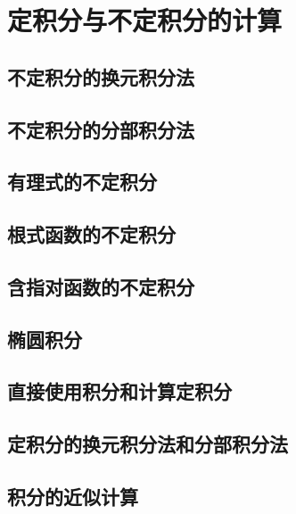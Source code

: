 
\section{定积分与不定积分的计算}
\label{sec:computation-of-definite-and-indefinite-integral}

\subsection{不定积分的换元积分法}
\label{sec:indefinite-integration-by-substitution}

\subsection{不定积分的分部积分法}
\label{sec:indefinite-integration-by-partial}

\subsection{有理式的不定积分}
\label{sec:indefinite-integration-of-rational-function}

\subsection{根式函数的不定积分}
\label{sec:indefinite-integration-of-irrational-function}

\subsection{含指对函数的不定积分}
\label{sec:indefinite-integration-of-exp-log-function}

\subsection{椭圆积分}
\label{sec:elliptic-integral}

\subsection{直接使用积分和计算定积分}
\label{sec:computation-of-definite-integral-by-riemann-sum}

\subsection{定积分的换元积分法和分部积分法}
\label{sec:definite-integral-by-substitution-or-partial}

\subsection{积分的近似计算}
\label{sec:approx-computation-of-integral}





